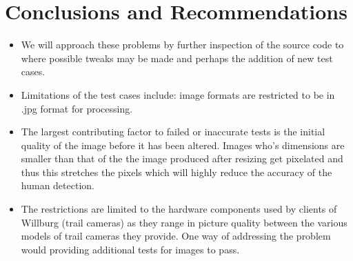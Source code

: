 \documentclass[a4paper,12pt]{report}
\begin{document}
	\section{Conclusions and Recommendations}
		\begin {itemize}
			\item We will approach these problems by further inspection of the source code to where possible tweaks may be made and perhaps the addition of new test cases.
			\item Limitations of the test cases include: image formats are restricted to be in .jpg format for processing.
			\item The largest contributing factor to failed or inaccurate tests is the initial quality of the image before it has been altered. Images who's dimensions are smaller than that of the the image produced after resizing get pixelated and thus this stretches the pixels which will highly reduce the accuracy of the human detection.			
			\item The restrictions are limited to the hardware components used by clients of Willburg (trail cameras) as they range in picture quality between the various models of trail cameras they provide. One way of addressing the problem would providing additional tests for images to pass.
		\end {itemize}
\end{document}
